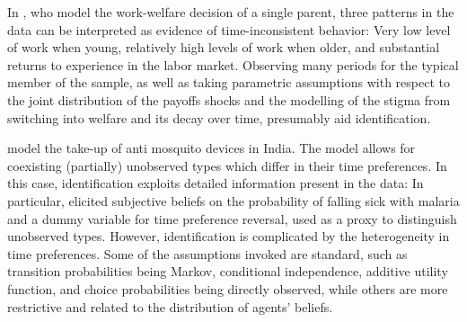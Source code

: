 In \textcite{FangSilverman2009}, who model the work-welfare decision of a single parent, three patterns in the data can be interpreted as evidence of time-inconsistent behavior: Very low level of work when young, relatively high levels of work when older, and substantial returns to experience in the labor market. Observing many periods for the typical member of the sample, as well as taking  parametric assumptions with respect to the joint distribution of the payoffs shocks and the modelling of the stigma from switching into welfare and its decay over time, presumably aid identification.

\textcite{TarozziMahajan2011} model the take-up of anti mosquito devices in India. The model allows for coexisting (partially) unobserved types which differ in their time preferences. In this case, identification exploits detailed information present in the data: In particular, elicited subjective beliefs on the probability of falling sick with malaria and a dummy variable for time preference reversal, used as a proxy to distinguish unobserved types. However, identification is complicated by the heterogeneity in time preferences. Some of the assumptions invoked are standard, such as transition probabilities being Markov, conditional independence, additive utility function, and choice probabilities being directly observed, while others are more restrictive and related to the distribution of agents' beliefs.